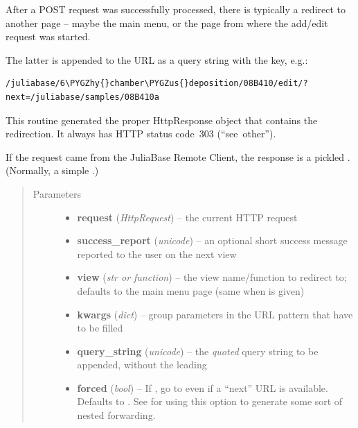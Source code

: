 \documentclass[a4paper,11pt,english]{sphinxmanual}
\def\PYGZus{\char`\_}
\def\PYGZhy{\char`\-}
\begin{document}
\begin{fulllineitems}
\label{programming/utilities:samples.utils.views.successful_response}
After a POST request was successfully processed, there is typically a
redirect to another page – maybe the main menu, or the page from where the
add/edit request was started.

The latter is appended to the URL as a query string with the  key,
e.g.:

\begin{Verbatim}[commandchars=\\\{\},formatcom=\scriptsize]
/juliabase/6\PYGZhy{}chamber\PYGZus{}deposition/08B410/edit/?next=/juliabase/samples/08B410a
\end{Verbatim}

This routine generated the proper HttpResponse object that contains the
redirection.  It always has HTTP status code 303 (“see other”).

If the request came from the JuliaBase Remote Client, the response is a
pickled .  (Normally, a simple .)
\begin{quote}\begin{description}
\item[{Parameters}] \leavevmode\begin{itemize}
\item {} 
\textbf{request} (\emph{HttpRequest}) -- the current HTTP request

\item {} 
\textbf{success\_report} (\emph{unicode}) -- an optional short success message reported to the
user on the next view

\item {} 
\textbf{view} (\emph{str or function}) -- the view name/function to redirect to; defaults to the main
menu page (same when  is given)

\item {} 
\textbf{kwargs} (\emph{dict}) -- group parameters in the URL pattern that have to be filled

\item {} 
\textbf{query\_string} (\emph{unicode}) -- the \emph{quoted} query string to be appended, without the
leading 

\item {} 
\textbf{forced} (\emph{bool}) -- If , go to  even if a “next” URL is
available.  Defaults to .  See  for
using this option to generate some sort of nested forwarding.


\end{itemize}
\end{description}
\end{quote}
\end{fulllineitems}
\end{document}

